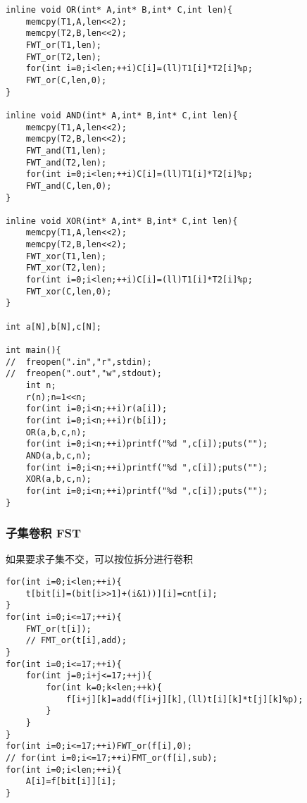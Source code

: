 \documentclass{ctexart}
\begin{document}
\begin{lstlisting}
inline void OR(int* A,int* B,int* C,int len){
    memcpy(T1,A,len<<2);
    memcpy(T2,B,len<<2);
    FWT_or(T1,len);
    FWT_or(T2,len);
    for(int i=0;i<len;++i)C[i]=(ll)T1[i]*T2[i]%p;
    FWT_or(C,len,0);
}

inline void AND(int* A,int* B,int* C,int len){
    memcpy(T1,A,len<<2);
    memcpy(T2,B,len<<2);
    FWT_and(T1,len);
    FWT_and(T2,len);
    for(int i=0;i<len;++i)C[i]=(ll)T1[i]*T2[i]%p;
    FWT_and(C,len,0);
}

inline void XOR(int* A,int* B,int* C,int len){
    memcpy(T1,A,len<<2);
    memcpy(T2,B,len<<2);
    FWT_xor(T1,len);
    FWT_xor(T2,len);
    for(int i=0;i<len;++i)C[i]=(ll)T1[i]*T2[i]%p;
    FWT_xor(C,len,0);
}

int a[N],b[N],c[N];

int main(){
//	freopen(".in","r",stdin);
//	freopen(".out","w",stdout);
    int n;
    r(n);n=1<<n;
    for(int i=0;i<n;++i)r(a[i]);
    for(int i=0;i<n;++i)r(b[i]);
    OR(a,b,c,n);
    for(int i=0;i<n;++i)printf("%d ",c[i]);puts("");
    AND(a,b,c,n);
    for(int i=0;i<n;++i)printf("%d ",c[i]);puts("");
    XOR(a,b,c,n);
    for(int i=0;i<n;++i)printf("%d ",c[i]);puts("");
}
\end{lstlisting}

\subsubsection{子集卷积 FST}
如果要求子集不交，可以按位拆分进行卷积
\begin{lstlisting}
for(int i=0;i<len;++i){
    t[bit[i]=(bit[i>>1]+(i&1))][i]=cnt[i];
}
for(int i=0;i<=17;++i){
    FWT_or(t[i]);
    // FMT_or(t[i],add);
}
for(int i=0;i<=17;++i){
    for(int j=0;i+j<=17;++j){
        for(int k=0;k<len;++k){
            f[i+j][k]=add(f[i+j][k],(ll)t[i][k]*t[j][k]%p);
        }
    }
}
for(int i=0;i<=17;++i)FWT_or(f[i],0);
// for(int i=0;i<=17;++i)FMT_or(f[i],sub);
for(int i=0;i<len;++i){
    A[i]=f[bit[i]][i];
}
\end{lstlisting}
\end{document}
